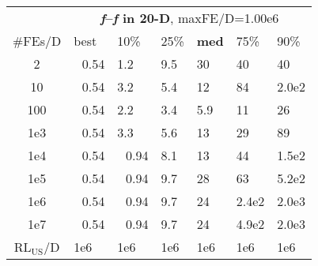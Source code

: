 \begin{tabular}{c|llllll}
 & \multicolumn{6}{|c}{\textbf{\textit{f}\raisebox{-0.35ex}{1}--\textit{f}\raisebox{-0.35ex}{24} in 20-D}, maxFE/D=1.00e6}\\
\#FEs/D & best & 10\% & 25\% & \textbf{med} & 75\% & 90\%\\
2 & ~\,0.54 & \hspace*{1ex}1.2 & \hspace*{1ex}9.5 & 30 & 40 & 40\\
10 & ~\,0.54 & \hspace*{1ex}3.2 & \hspace*{1ex}5.4 & 12 & 84 & 2.0e2\\
100 & ~\,0.54 & \hspace*{1ex}2.2 & \hspace*{1ex}3.4 & \hspace*{1ex}5.9 & 11 & 26\\
1e3 & ~\,0.54 & \hspace*{1ex}3.3 & \hspace*{1ex}5.6 & 13 & 29 & 89\\
1e4 & ~\,0.54 & ~\,0.94 & \hspace*{1ex}8.1 & 13 & 44 & 1.5e2\\
1e5 & ~\,0.54 & ~\,0.94 & \hspace*{1ex}9.7 & 28 & 63 & 5.2e2\\
1e6 & ~\,0.54 & ~\,0.94 & \hspace*{1ex}9.7 & 24 & 2.4e2 & 2.0e3\\
1e7 & ~\,0.54 & ~\,0.94 & \hspace*{1ex}9.7 & 24 & 4.9e2 & 2.0e3\\
$\text{RL}_{\text{US}}$/D & 1e6 & 1e6 & 1e6 & 1e6 & 1e6 & 1e6
\end{tabular}
